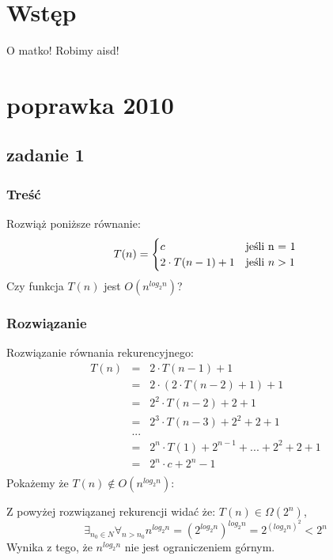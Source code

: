 \documentclass[svgnames]{report}
\begin{document}
\chapter{Wstęp}
O matko! Robimy aisd!


\chapter{poprawka 2010}

\section{zadanie 1}
\subsection{Treść}
Rozwiąż poniższe równanie:
\begin{equation*}
T(n) = 
	\begin{cases}
		c 					&	\hbox{jeśli n = 1}		\\
		2 \cdot T(n-1) + 1 	&	\hbox{jeśli $n > 1$}	\\
	\end{cases}
\end{equation*}
Czy funkcja $T(n)$ jest $O(n^{log_2 n})$?
\subsection{Rozwiązanie}
Rozwiązanie równania rekurencyjnego:
\begin{eqnarray*}
T(n) 	&=& 2 \cdot T(n-1) + 1	\\
		&=&	2 \cdot ( 2\cdot T(n-2) + 1 ) + 1	\\
		&=& 2^2 \cdot T(n-2) + 2 + 1	\\
		&=&	2^3 \cdot T(n-3) + 2^2 + 2 + 1 \\
		&...&	\\
		&=&	2^n\cdot T(1) + 2^{n-1} + ... + 2^2 + 2 + 1 \\
		&=& 2^n \cdot c + 2^n - 1	\\
\end{eqnarray*}
Pokażemy że $T(n) \not\in O(n^{log_2 n})$:

Z powyżej rozwiązanej rekurencji widać że: $T(n) \in \Omega (2^n)$, 
\begin{equation}
	\exists_{n_0 \in N} \forall_{n > n_0} n^{log_2 n} = \left(2^{log_2 n}\right)^{log_2 n} = 2^{(log_2 n)^2} < 2^n
\end{equation}
Wynika z tego, że $n^{log_2 n}$ nie jest ograniczeniem górnym.
\end{document}
